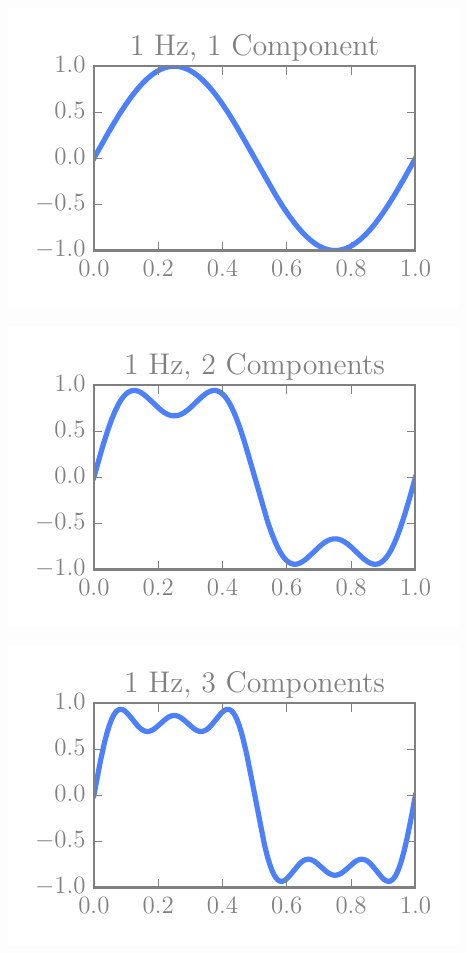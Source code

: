 \begin{multicols}{5}
\includegraphics[width=\linewidth]{../img/fouriers/1_1.pdf}

\includegraphics[width=\linewidth]{../img/fouriers/1_2.pdf}

\includegraphics[width=\linewidth]{../img/fouriers/1_3.pdf}


\end{multicols}
